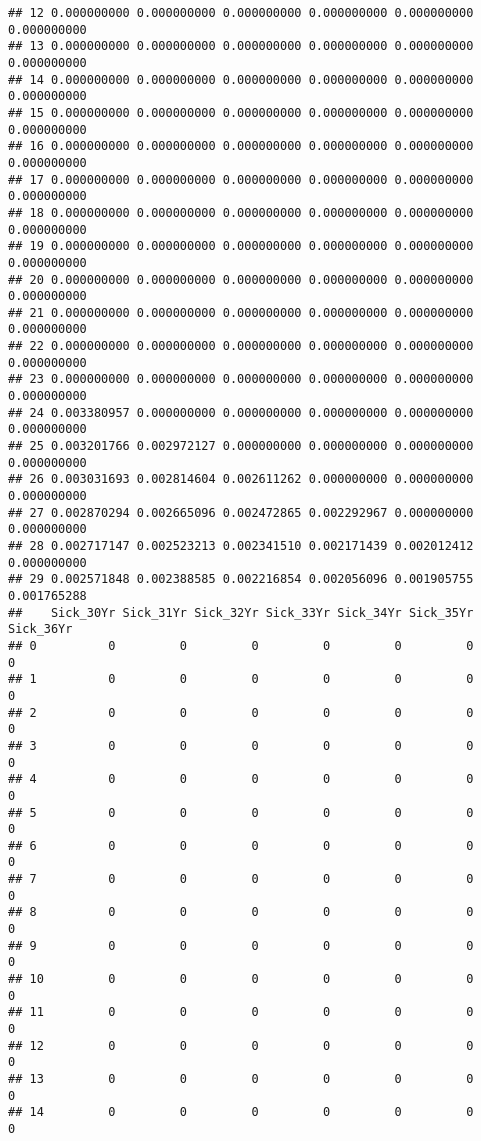 \documentclass[
]{article}
\begin{document}
\begin{verbatim}
## 12 0.000000000 0.000000000 0.000000000 0.000000000 0.000000000 0.000000000
## 13 0.000000000 0.000000000 0.000000000 0.000000000 0.000000000 0.000000000
## 14 0.000000000 0.000000000 0.000000000 0.000000000 0.000000000 0.000000000
## 15 0.000000000 0.000000000 0.000000000 0.000000000 0.000000000 0.000000000
## 16 0.000000000 0.000000000 0.000000000 0.000000000 0.000000000 0.000000000
## 17 0.000000000 0.000000000 0.000000000 0.000000000 0.000000000 0.000000000
## 18 0.000000000 0.000000000 0.000000000 0.000000000 0.000000000 0.000000000
## 19 0.000000000 0.000000000 0.000000000 0.000000000 0.000000000 0.000000000
## 20 0.000000000 0.000000000 0.000000000 0.000000000 0.000000000 0.000000000
## 21 0.000000000 0.000000000 0.000000000 0.000000000 0.000000000 0.000000000
## 22 0.000000000 0.000000000 0.000000000 0.000000000 0.000000000 0.000000000
## 23 0.000000000 0.000000000 0.000000000 0.000000000 0.000000000 0.000000000
## 24 0.003380957 0.000000000 0.000000000 0.000000000 0.000000000 0.000000000
## 25 0.003201766 0.002972127 0.000000000 0.000000000 0.000000000 0.000000000
## 26 0.003031693 0.002814604 0.002611262 0.000000000 0.000000000 0.000000000
## 27 0.002870294 0.002665096 0.002472865 0.002292967 0.000000000 0.000000000
## 28 0.002717147 0.002523213 0.002341510 0.002171439 0.002012412 0.000000000
## 29 0.002571848 0.002388585 0.002216854 0.002056096 0.001905755 0.001765288
##    Sick_30Yr Sick_31Yr Sick_32Yr Sick_33Yr Sick_34Yr Sick_35Yr Sick_36Yr
## 0          0         0         0         0         0         0         0
## 1          0         0         0         0         0         0         0
## 2          0         0         0         0         0         0         0
## 3          0         0         0         0         0         0         0
## 4          0         0         0         0         0         0         0
## 5          0         0         0         0         0         0         0
## 6          0         0         0         0         0         0         0
## 7          0         0         0         0         0         0         0
## 8          0         0         0         0         0         0         0
## 9          0         0         0         0         0         0         0
## 10         0         0         0         0         0         0         0
## 11         0         0         0         0         0         0         0
## 12         0         0         0         0         0         0         0
## 13         0         0         0         0         0         0         0
## 14         0         0         0         0         0         0         0

\end{verbatim}
\end{document}
